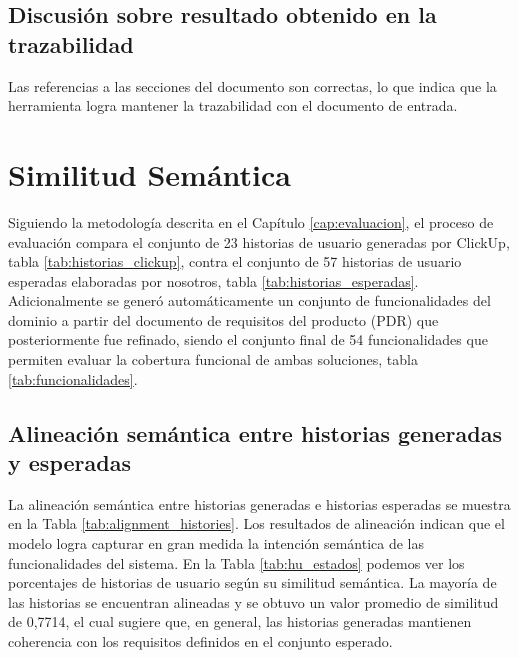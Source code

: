 \subsection{Discusión sobre resultado obtenido en la trazabilidad}
Las referencias a las secciones del documento son correctas, lo que indica que la herramienta logra mantener la trazabilidad con el documento de entrada.

\section{Similitud Semántica}
Siguiendo la metodología descrita en el Capítulo \ref{cap:evaluacion}, el proceso de evaluación compara el conjunto de 23 historias de usuario generadas por ClickUp, tabla \ref{tab:historias_clickup}, contra el conjunto de 57 historias de usuario esperadas elaboradas por nosotros, tabla \ref{tab:historias_esperadas}. Adicionalmente se generó automáticamente un conjunto de funcionalidades del dominio a partir del documento de requisitos del producto (PDR) que posteriormente fue refinado, siendo el conjunto final de 54 funcionalidades que permiten evaluar la cobertura funcional de ambas soluciones, tabla \ref{tab:funcionalidades}.



\subsection{Alineación semántica entre historias generadas y esperadas}
La alineación semántica entre historias generadas e historias esperadas se muestra en la Tabla \ref{tab:alignment_histories}.
Los resultados de alineación indican que el modelo logra capturar en gran medida la intención semántica de las funcionalidades del sistema. En la Tabla \ref{tab:hu_estados} podemos ver los porcentajes de historias de usuario según su similitud semántica. La mayoría de las historias se encuentran alineadas y se obtuvo un valor promedio de similitud de 0,7714, el cual sugiere que, en general, las historias generadas mantienen coherencia con los requisitos definidos en el conjunto esperado.

